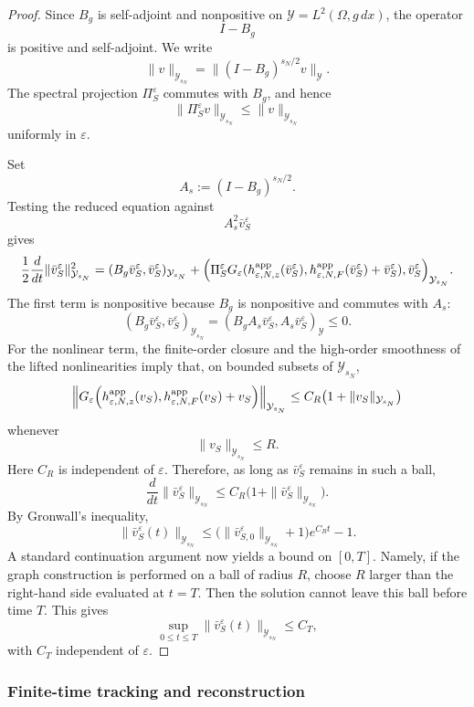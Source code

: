 \documentclass[11pt]{article}
\theoremstyle{definition}
\theoremstyle{remark}
\numberwithin{equation}{section}
\begin{document}
\begin{proof}
Since \(B_g\) is self-adjoint and nonpositive on
\(\mathcal Y=L^2(\Omega,g\,dx)\), the operator
\[
I-B_g
\]
is positive and self-adjoint. We write
\[
\|v\|_{\mathcal Y_{s_N}}
=
\|(I-B_g)^{s_N/2}v\|_{\mathcal Y}.
\]
The spectral projection \(\Pi_S^\varepsilon\) commutes with \(B_g\), and hence
\[
\|\Pi_S^\varepsilon v\|_{\mathcal Y_{s_N}}
\le
\|v\|_{\mathcal Y_{s_N}}
\]
uniformly in \(\varepsilon\).

Set
\[
A_s:=(I-B_g)^{s_N/2}.
\]
Testing the reduced equation against
\[
A_s^2\bar v_S^\varepsilon
\]
gives
\[
\frac12
\frac{d}{dt}
\|\bar v_S^\varepsilon\|_{\mathcal Y_{s_N}}^2
=
(B_g\bar v_S^\varepsilon,\bar v_S^\varepsilon)_{\mathcal Y_{s_N}}
+
\Big(
\Pi_S^\varepsilon
G_\varepsilon(
h_{\varepsilon,N,z}^{\rm app}(\bar v_S^\varepsilon),
h_{\varepsilon,N,F}^{\rm app}(\bar v_S^\varepsilon)
+\bar v_S^\varepsilon),
\bar v_S^\varepsilon
\Big)_{\mathcal Y_{s_N}}.
\]
The first term is nonpositive because \(B_g\) is nonpositive and commutes with
\(A_s\):
\[
(B_g\bar v_S^\varepsilon,\bar v_S^\varepsilon)_{\mathcal Y_{s_N}}
=
(B_gA_s\bar v_S^\varepsilon,A_s\bar v_S^\varepsilon)_{\mathcal Y}
\le0.
\]
For the nonlinear term, the finite-order closure and the high-order smoothness
of the lifted nonlinearities imply that, on bounded subsets of
\(\mathcal Y_{s_N}\),
\[
\left\|
G_\varepsilon\Big(
h_{\varepsilon,N,z}^{\rm app}(v_S),
h_{\varepsilon,N,F}^{\rm app}(v_S)+v_S
\Big)
\right\|_{\mathcal Y_{s_N}}
\le
C_R\bigl(1+\|v_S\|_{\mathcal Y_{s_N}}\bigr)
\]
whenever
\[
\|v_S\|_{\mathcal Y_{s_N}}\le R.
\]
Here \(C_R\) is independent of \(\varepsilon\). Therefore, as long as
\(\bar v_S^\varepsilon\) remains in such a ball,
\[
\frac{d}{dt}
\|\bar v_S^\varepsilon\|_{\mathcal Y_{s_N}}
\le
C_R\bigl(1+\|\bar v_S^\varepsilon\|_{\mathcal Y_{s_N}}\bigr).
\]
By Gronwall's inequality,
\[
\|\bar v_S^\varepsilon(t)\|_{\mathcal Y_{s_N}}
\le
\bigl(\|\bar v_{S,0}^\varepsilon\|_{\mathcal Y_{s_N}}+1\bigr)e^{C_Rt}-1.
\]
A standard continuation argument now yields a bound on \([0,T]\). Namely, if
the graph construction is performed on a ball of radius \(R\), choose \(R\)
larger than the right-hand side evaluated at \(t=T\). Then the solution cannot
leave this ball before time \(T\). This gives
\[
\sup_{0\le t\le T}
\|\bar v_S^\varepsilon(t)\|_{\mathcal Y_{s_N}}
\le C_T,
\]
with \(C_T\) independent of \(\varepsilon\).
\end{proof}



\subsubsection*{Finite-time tracking and reconstruction}
\end{document}
